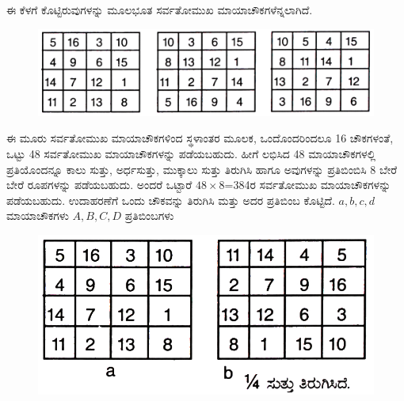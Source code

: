 ಈ ಕೆಳಗೆ ಕೊಟ್ಟಿರುವುಗಳನ್ನು ಮೂಲಭೂತ ಸರ್ವತೋಮುಖ ಮಾಯಾಚೌಕಗಳೆನ್ನ\-ಲಾಗಿದೆ.
\begin{figure}[H]
\includegraphics[scale=.8]{src/figures/chap4/fig4.10.jpg}
\end{figure}

ಈ ಮೂರು ಸರ್ವತೋಮುಖ ಮಾಯಾಚೌಕಗಳಿಂದ ಸ್ಥಳಾಂತರ ಮೂಲಕ, ಒಂದೊಂದ\-ರಿಂದಲೂ 16 ಚೌಕಗಳಂತೆ, ಒಟ್ಟು 48 ಸರ್ವತೋಮುಖ ಮಾಯಾಚೌಕಗಳನ್ನು ಪಡೆಯ\-ಬಹುದು. ಹೀಗೆ ಲಭಿಸಿದ 48 ಮಾಯಾಚೌಕಗಳಲ್ಲಿ ಪ್ರತಿಯೊಂದನ್ನೂ ಕಾಲು ಸುತ್ತು, ಅರ್ಧಸುತ್ತು, ಮುಕ್ಕಾಲು ಸುತ್ತು ತಿರುಗಿಸಿ ಹಾಗೂ ಅವುಗಳನ್ನು ಪ್ರತಿಬಿಂಬಿಸಿ 8 ಬೇರೆ ಬೇರೆ ರೂಪಗಳನ್ನು ಪಡೆಯಬಹುದು. ಅಂದರೆ ಒಟ್ಟಾರೆ $48 \times 8$=384ರ ಸರ್ವತೋಮುಖ ಮಾಯಾಚೌಕಗಳನ್ನು ಪಡೆಯಬಹುದು. ಉದಾಹರಣೆಗೆ ಒಂದು ಚೌಕವನ್ನು ತಿರುಗಿಸಿ ಮತ್ತು ಅದರ ಪ್ರತಿಬಿಂಬ ಕೊಟ್ಟಿದೆ. $a, b, c, d$ ಮಾಯಾಚೌಕಗಳು $A, B, C, D$ ಪ್ರತಿಬಿಂಬಗಳು
\begin{figure}[H]
\includegraphics[scale=.8]{src/figures/chap4/fig4.11.jpg}
\end{figure}

\newpage

